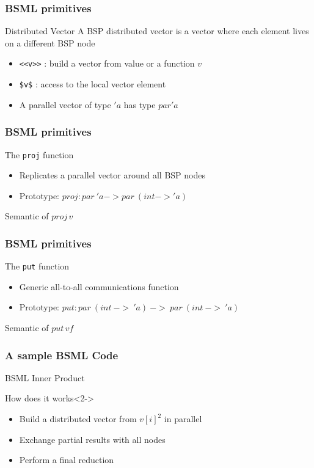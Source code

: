 \frame
{
  \frametitle{BSML primitives}
  \begin{block}{Distributed Vector}
  \footnotesize
   A BSP distributed vector is a vector where each element lives on a different BSP node
  \begin{itemize}
  \footnotesize
  \item \texttt{<<v>>} : build a vector from value or a function $v$
  \item \texttt{\$v\$} : access to the local vector element
  \item A parallel vector of type $'a$ has type $par 'a$
  \end{itemize}
  \end{block}
}

\frame
{
  \frametitle{BSML primitives}
  \begin{block}{The \texttt{proj} function}
  \footnotesize
   \begin{itemize}
  \footnotesize
  \item Replicates a parallel vector around all BSP nodes
  \item Prototype: $proj : par\ 'a -> par\ (int-> 'a)$
  \end{itemize}
  \end{block}

  \begin{block}{Semantic of $proj \, v$}
  \begin{center}\end{center}
  \end{block}
}

\frame
{
  \frametitle{BSML primitives}
  \begin{block}{The \texttt{put} function}
  \footnotesize
   \begin{itemize}
  \footnotesize
  \item Generic all-to-all communications function
  \item Prototype: $put : par\ (int\ ->\ 'a)\ ->\ par\ (int\ ->\ 'a)$
  \end{itemize}
  \end{block}

  \begin{block}{Semantic of $put \, vf$}
  \begin{center}\end{center}
  \end{block}
}

\frame
{
  \frametitle{A sample BSML Code}
  \begin{block}{BSML Inner Product}
  \lstbsml
  \end{block}

  \begin{block}{How does it works}<2->
  \begin{itemize}
  \footnotesize
  \item Build a distributed vector from $v[i]^2$ in parallel
  \item Exchange partial results with all nodes
  \item Perform a final reduction
  \end{itemize}
  \end{block}
}

